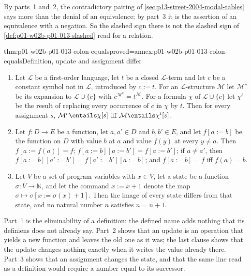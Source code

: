 By parts~1 and~2, the contradictory pairing of
\cref{sec:p13-street-2004-modal-tables} says more than the denial of an
equivalence; by part~3 it is the assertion of an equivalence with a
negation.  So the slashed sign there is not the slashed sign of
\cref{def:p01-w02b-p01-013-slashed} read for a relation.

\begin{hblemma}{thm:p01-w02b-p01-013-colon-equals}{proved=annex:p01-w02b-p01-013-colon-equals}{Definition, update and assignment differ}
\begin{enumerate}
  \item Let \(\mathcal L\) be a first-order language, let \(t\) be a closed
  \(\mathcal L\)-term and let \(c\) be a constant symbol not in
  \(\mathcal L\), introduced by \(c:=t\).  For an \(\mathcal L\)-structure
  \(\mathcal M\) let \(\mathcal M^{c}\) be its expansion to
  \(\mathcal L\cup\{c\}\) with \(c^{\mathcal M^{c}}=t^{\mathcal M}\).  For a
  formula \(\chi\) of \(\mathcal L\cup\{c\}\) let \(\chi^{t}\) be the result
  of replacing every occurrence of \(c\) in \(\chi\) by \(t\).  Then for
  every assignment \(s\), \(\mathcal M^{c}\entails\chi[s]\) iff
  \(\mathcal M\entails\chi^{t}[s]\).
  \item Let \(f:D\to E\) be a function, let \(a,a'\in D\) and
  \(b,b'\in E\), and let \(f[a:=b]\) be the function on \(D\) with value
  \(b\) at \(a\) and value \(f(y)\) at every \(y\neq a\).  Then
  \(f[a:=f(a)]=f\); \(f[a:=b][a:=b']=f[a:=b']\); if \(a\neq a'\), then
  \(f[a:=b][a':=b']=f[a':=b'][a:=b]\); and \(f[a:=b]=f\) iff \(f(a)=b\).
  \item Let \(V\) be a set of program variables with \(x\in V\), let a state
  be a function \(\sigma:V\to\mathbb N\), and let the command \(x:=x+1\)
  denote the map \(\sigma\mapsto\sigma[x:=\sigma(x)+1]\).  Then the image of
  every state differs from that state, and no natural number \(n\)
  satisfies \(n=n+1\).
\end{enumerate}
\end{hblemma}

Part~1 is the eliminability of a definition: the defined name adds nothing
that its definiens does not already say.  Part~2 shows that an update is an
operation that yields a new function and leaves the old one as it was; the
last clause shows that the update changes nothing exactly when it writes the
value already there.  Part~3 shows that an assignment changes the state, and
that the same line read as a definition would require a number equal to its
successor.


